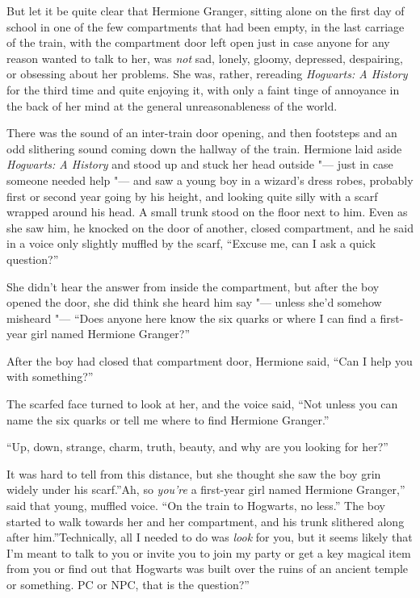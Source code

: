 But let it be quite clear that Hermione Granger, sitting alone on the
first day of school in one of the few compartments that had been empty,
in the last carriage of the train, with the compartment door left open
just in case anyone for any reason wanted to talk to her, was \emph{not}
sad, lonely, gloomy, depressed, despairing, or obsessing about her
problems. She was, rather, rereading \emph{Hogwarts: A History} for the
third time and quite enjoying it, with only a faint tinge of annoyance
in the back of her mind at the general unreasonableness of the world.

There was the sound of an inter-train door opening, and then footsteps
and an odd slithering sound coming down the hallway of the train.
Hermione laid aside \emph{Hogwarts: A History} and stood up and stuck
her head outside "--- just in case someone needed help "--- and saw a young
boy in a wizard's dress robes, probably first or second year going by
his height, and looking quite silly with a scarf wrapped around his
head. A small trunk stood on the floor next to him. Even as she saw him,
he knocked on the door of another, closed compartment, and he said in a
voice only slightly muffled by the scarf, ``Excuse me, can I ask a quick
question?''

She didn't hear the answer from inside the compartment, but after the
boy opened the door, she did think she heard him say "--- unless she'd
somehow misheard "--- ``Does anyone here know the six quarks or where I can
find a first-year girl named Hermione Granger?''

After the boy had closed that compartment door, Hermione said, ``Can I
help you with something?''

The scarfed face turned to look at her, and the voice said, ``Not unless
you can name the six quarks or tell me where to find Hermione Granger.''

``Up, down, strange, charm, truth, beauty, and why are you looking for
her?''

It was hard to tell from this distance, but she thought she saw the boy
grin widely under his scarf.''Ah, so \emph{you're} a first-year girl
named Hermione Granger,'' said that young, muffled voice. ``On the train
to Hogwarts, no less.'' The boy started to walk towards her and her
compartment, and his trunk slithered along after him.''Technically, all
I needed to do was \emph{look} for you, but it seems likely that I'm
meant to talk to you or invite you to join my party or get a key magical
item from you or find out that Hogwarts was built over the ruins of an
ancient temple or something. PC or NPC, that is the question?''

